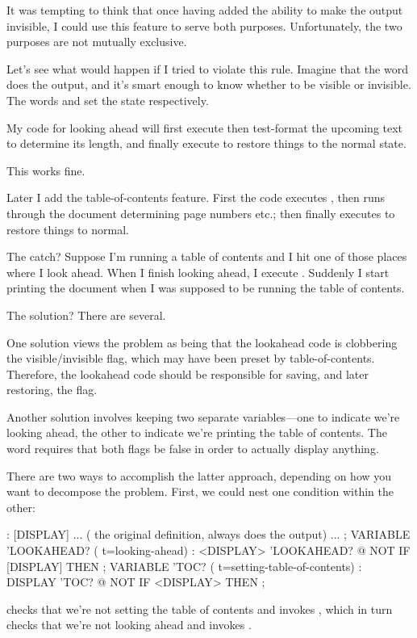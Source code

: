 It was tempting to think that once having added the ability to make
the output invisible, I could use this feature to serve both purposes.
Unfortunately, the two purposes are not mutually exclusive.

Let's see what would happen if I tried to violate this rule. Imagine
that the word  does the output, and it's smart enough
to know whether to be visible or invisible. The words 
and  set the state respectively.

My code for looking ahead will first execute  then
test-format the upcoming text to determine its length, and finally
execute  to restore things to the normal state.

This works fine.

Later I add the table-of-contents feature. First the code executes
, then runs through the document determining page
numbers etc.; then finally executes  to restore things
to normal.

The catch? Suppose I'm running a table of contents and I hit one of
those places where I look ahead. When I finish looking ahead, I
execute . Suddenly I start printing the document when I
was supposed to be running the table of contents.

The solution? There are several.

One solution views the problem as being that the lookahead code is
clobbering the visible/invisible flag, which may have been preset by
table-of-contents. Therefore, the lookahead code should be responsible for
saving, and later restoring, the flag.

Another solution involves keeping two separate variables---one to
indicate we're looking ahead, the other to indicate we're printing the
table of contents. The word  requires that both flags
be false in order to actually display anything.

There are two ways to accomplish the latter approach, depending on
how you want to decompose the problem. First, we could nest one condition
within the other:

\begin{Code}
: [DISPLAY]  ...
( the original definition, always does the output) ... ;
VARIABLE 'LOOKAHEAD?  ( t=looking-ahead)
: <DISPLAY>   'LOOKAHEAD? @ NOT IF  [DISPLAY]  THEN ;
VARIABLE 'TOC?  ( t=setting-table-of-contents)
: DISPLAY   'TOC? @ NOT IF  <DISPLAY>  THEN ;
\end{Code}
 checks that we're not setting the table of contents
and invokes , which in turn checks that we're not
looking ahead and invokes \forth{[DISPLAY]}.


